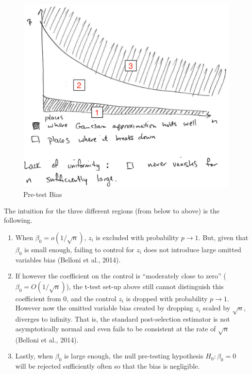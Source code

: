 \documentclass[12pt,]{book}
\providecommand{\tightlist}{%
  \setlength{\itemsep}{0pt}\setlength{\parskip}{0pt}}
\begin{document}
\begin{figure}
\centering
\includegraphics{figures/Fig_623.png}
\caption{Pre-test Bias}
\end{figure}

The intuition for the three different regions (from below to above) is the following.

\begin{enumerate}
\def\labelenumi{\arabic{enumi}.}
\tightlist
\item
  When \(\beta_0 = o(1/\sqrt{n})\), \(z_i\) is excluded with probability \(p \to 1\). But, given that \(\beta_0\) is small enough, failing to control for \(z_i\) does not introduce large omitted variables bias (Belloni et al., 2014).
\item
  If however the coefficient on the control is ``moderately close to zero'' (\(\beta_0 = O(1/\sqrt{n})\)), the t-test set-up above still cannot distinguish this coefficient from \(0\), and the control \(z_i\) is dropped with probability \(p \to 1\). However now the omitted variable bias created by dropping \(z_i\) scaled by \(\sqrt{n}\), diverges to infinity. That is, the standard post-selection estimator is not asymptotically normal and even fails to be consistent at the rate of \(\sqrt{n}\) (Belloni et al., 2014).
\item
  Lastly, when \(\beta_0\) is large enough, the null pre-testing hypothesis \(H_0 : \beta_0 = 0\) will be rejected sufficiently often so that the bias is negligible.
\end{enumerate}
\end{document}
